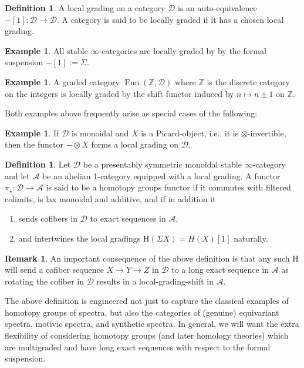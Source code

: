 \documentclass[10pt]{amsart}
\theoremstyle{definition}
\numberwithin{figure}{section}
\numberwithin{equation}{section}
\newtheorem{definition}[figure]{Definition}
\newtheorem{remark}[figure]{Remark}
\newtheorem{example}[figure]{Example}
\newcommand{\cA}{\mathcal{A}}
\newcommand{\cD}{\mathcal{D}}
\theoremstyle{cited}
\newcommand{\bZ}{\mathbb{Z}}
\newcommand{\Fun}{\operatorname{Fun}}
\renewcommand{\H}{\mathrm{H}}
\begin{document}
\begin{definition}
  A local grading on a category $\cD$ is an auto-equivalence $-[1]:\cD\to \cD$. A category is said to be locally graded if it has a chosen local grading.
\end{definition}

\begin{example}
  All stable $\infty$-categories are locally graded by by the formal suspension $-[1]:=\Sigma$. 
\end{example}

\begin{example}
  A graded category $\Fun(\bZ,\cD)$ where $\bZ$ is the discrete category on the integers is locally graded by the shift functor induced by $n\mapsto n\pm 1$ on $\bZ$.
\end{example}

Both examples above frequently arise as special cases of the following:

\begin{example}
  If $\cD$ is monoidal and $X$ is a Picard-object, i.e., it is $\otimes$-invertible, then the functor $-\otimes X$ forms a local grading on $\cD$.
\end{example}

\begin{definition}
  Let $\cD$ be a presentably symmetric monoidal stable $\infty$-category and let $\cA$ be an abelian 1-category equipped with a local grading. A functor $\pi_\star:\cD\to \cA$ is said to be a homotopy groups functor if it commutes with filtered colimits, is lax monoidal and additive, and if in addition it
  \begin{enumerate}
    \item sends cofibers in $\cD$ to exact sequences in $\cA$,
    \item and intertwines the local gradings $\H(\Sigma X)=H(X)[1]$ naturally.
  \end{enumerate}
\end{definition}

\begin{remark}
  An important consequence of the above definition is that any such $\H$ will send a cofiber sequence $X\to Y\to Z$ in $\cD$ to a long exact sequence in $\cA$ as rotating the cofiber in $\cD$ results in a local-grading-shift in $\cA$.
\end{remark}

The above definition is engineered not just to capture the classical examples of homotopy groups of spectra, but also the categories of (genuine) equivariant spectra, motivic spectra, and synthetic spectra. In general, we will want the extra flexibility of considering homotopy groups (and later homology theories) which are multigraded and have long exact sequences with respect to the formal suspension.
\end{document}

